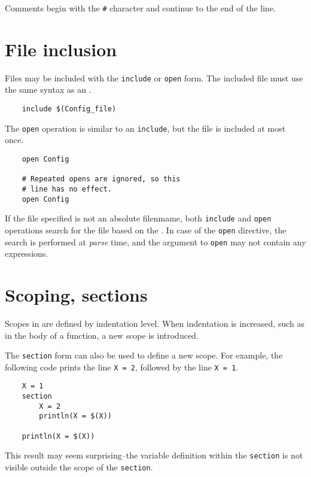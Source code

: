 Comments begin with the \verb+#+ character and continue to the end of the line.

\section{File inclusion}
\label{section:include}

Files may be included with the \verb+include+ or \verb+open+ form.  The included file must use
the same syntax as an .

\begin{verbatim}
    include $(Config_file)
\end{verbatim}

The \verb+open+ operation is similar to an \verb+include+, but the file is included at most once.
\begin{verbatim}
    open Config

    # Repeated opens are ignored, so this
    # line has no effect.
    open Config
\end{verbatim}

If the file specified is not an absolute filenmame, both \verb+include+ and
\verb+open+ operations search for the file based on the
. In case of the \verb+open+ directive, the search is
performed at \emph{parse} time, and the argument to \verb+open+ may not
contain any expressions.

\section{Scoping, sections}
\label{section:section}

Scopes in  are defined by indentation level.  When indentation is
increased, such as in the body of a function, a new scope is introduced.

The \verb+section+ form can also be used to define a new scope.  For example, the following code
prints the line \verb+X = 2+, followed by the line \verb+X = 1+.

\begin{verbatim}
    X = 1
    section
        X = 2
        println(X = $(X))

    println(X = $(X))
\end{verbatim}

This result may seem surprising--the variable definition within the
\verb+section+ is not visible outside the scope of the \verb+section+.

